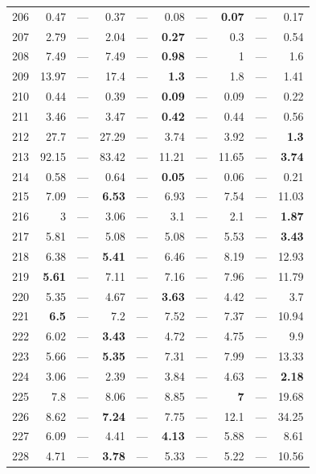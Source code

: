 \begin{longtable}{lr@{\hskip 4pt}l@{\hskip 12pt}r@{\hskip 4pt}l@{\hskip 12pt}r@{\hskip 4pt}l@{\hskip 12pt}r@{\hskip 4pt}l@{\hskip 12pt}r}
206 & 0.47 & --- & 0.37 & --- & 0.08 & --- & \textbf{0.07} & --- & 0.17 \\
207 & 2.79 & --- & 2.04 & --- & \textbf{0.27} & --- & 0.3 & --- & 0.54 \\
208 & 7.49 & --- & 7.49 & --- & \textbf{0.98} & --- & 1 & --- & 1.6 \\
209 & 13.97 & --- & 17.4 & --- & \textbf{1.3} & --- & 1.8 & --- & 1.41 \\
210 & 0.44 & --- & 0.39 & --- & \textbf{0.09} & --- & 0.09 & --- & 0.22 \\
211 & 3.46 & --- & 3.47 & --- & \textbf{0.42} & --- & 0.44 & --- & 0.56 \\
212 & 27.7 & --- & 27.29 & --- & 3.74 & --- & 3.92 & --- & \textbf{1.3} \\
213 & 92.15 & --- & 83.42 & --- & 11.21 & --- & 11.65 & --- & \textbf{3.74} \\
214 & 0.58 & --- & 0.64 & --- & \textbf{0.05} & --- & 0.06 & --- & 0.21 \\
215 & 7.09 & --- & \textbf{6.53} & --- & 6.93 & --- & 7.54 & --- & 11.03 \\
216 & 3 & --- & 3.06 & --- & 3.1 & --- & 2.1 & --- & \textbf{1.87} \\
217 & 5.81 & --- & 5.08 & --- & 5.08 & --- & 5.53 & --- & \textbf{3.43} \\
218 & 6.38 & --- & \textbf{5.41} & --- & 6.46 & --- & 8.19 & --- & 12.93 \\
219 & \textbf{5.61} & --- & 7.11 & --- & 7.16 & --- & 7.96 & --- & 11.79 \\
220 & 5.35 & --- & 4.67 & --- & \textbf{3.63} & --- & 4.42 & --- & 3.7 \\
221 & \textbf{6.5} & --- & 7.2 & --- & 7.52 & --- & 7.37 & --- & 10.94 \\
222 & 6.02 & --- & \textbf{3.43} & --- & 4.72 & --- & 4.75 & --- & 9.9 \\
223 & 5.66 & --- & \textbf{5.35} & --- & 7.31 & --- & 7.99 & --- & 13.33 \\
224 & 3.06 & --- & 2.39 & --- & 3.84 & --- & 4.63 & --- & \textbf{2.18} \\
225 & 7.8 & --- & 8.06 & --- & 8.85 & --- & \textbf{7} & --- & 19.68 \\
226 & 8.62 & --- & \textbf{7.24} & --- & 7.75 & --- & 12.1 & --- & 34.25 \\
227 & 6.09 & --- & 4.41 & --- & \textbf{4.13} & --- & 5.88 & --- & 8.61 \\
228 & 4.71 & --- & \textbf{3.78} & --- & 5.33 & --- & 5.22 & --- & 10.56 \\

\end{longtable}

